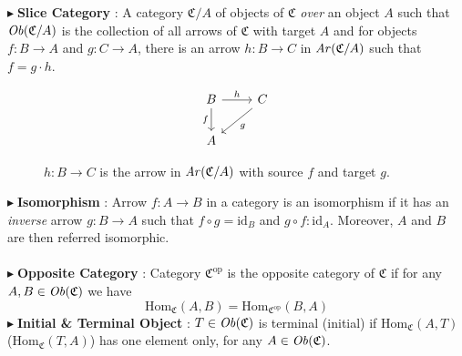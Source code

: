 \documentclass{article}
\theoremstyle{definition}
\theoremstyle{remark}
\theoremstyle{definition}
\theoremstyle{definition}
\theoremstyle{definition}
\newcommand{\cat}[1]{\mathfrak{#1}}
\newcommand{\opcat}[1]{\mathfrak{#1}^{\text{op}}}
\newcommand{\obj}[1]{\text{\textit{Ob}}(#1)}
\newcommand{\arr}[1]{\text{\textit{Ar}}(#1)}
\newcommand{\Id}[1]{\text{id}_{#1}}
\newcommand{\homset}[3]{\text{Hom}_{#1}(#2,#3)}
\newcommand{\point}[0]{$\blacktriangleright\;$}
\begin{document}
\point\textbf{Slice Category} : A category $ \cat{C}/A $ of objects of $ \cat{C} $ \textit{over} an object $ A $ such that $ \obj{\cat{C}/A} $ is the collection of all arrows of $ \cat{C} $ with target $ A $ and for objects $ f:B\to A $ and $ g:C\to A $, there is an arrow $ h :B\to C$ in $ \arr{\cat{C}/A} $ such that $ f = g\cdot h $.
\begin{figure}[h!]
	\[\begin{tikzcd}
		B\arrow[swap]{d}{f}\arrow{r}{h}  &C \arrow{dl}{g}\\
		A
	\end{tikzcd}\]
\caption{$ h : B\to C $ is the arrow in $ \arr{\cat{C}/A} $ with source $ f $ and target $ g $.}
\end{figure}
\newline
\point \textbf{Isomorphism} : Arrow $ f : A\to B $ in a category is an isomorphism if it has an \emph{inverse} arrow $ g:B\to A $ such that $ f\circ g = \Id{B} $ and $ g\circ f: \Id{A} $. Moreover, $ A $ and $ B $ are then referred isomorphic.\\\\
\point \textbf{Opposite Category} : Category $ \opcat{C} $ is the opposite category of $ \cat{C} $ if for any $ A,B\in \obj{\cat{C}}$ we have
\[\homset{\cat{C}}{A}{B} = \homset{\opcat{C}}{B}{A}\]
\point \textbf{Initial \& Terminal Object} : $ T\in \obj{\cat{C}} $ is terminal (initial) if $ \homset{\cat{C}}{A}{T} $ ($ \homset{\cat{C}}{T}{A} $) has one element only, for any $ A\in \obj{\cat{C}} $. 

\hrulefill
\end{document}
